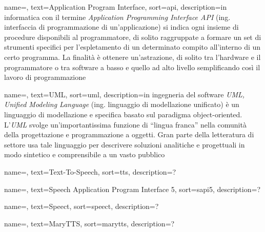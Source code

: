 
\renewcommand{\acronymname}{Acronimi e abbreviazioni}


   
   


{
    name=,
    text=Application Program Interface,
    sort=api,
    description={in informatica con il termine \emph{Application Programming Interface API} (ing. interfaccia di programmazione di un'applicazione) si indica ogni insieme di procedure disponibili al programmatore, di solito raggruppate a formare un set di strumenti specifici per l'espletamento di un determinato compito all'interno di un certo programma. La finalità è ottenere un'astrazione, di solito tra l'hardware e il programmatore o tra software a basso e quello ad alto livello semplificando così il lavoro di programmazione}
}

{
    name=,
    text=UML,
    sort=uml,
    description={in ingegneria del software \emph{UML, Unified Modeling Language} (ing. linguaggio di modellazione unificato) è un linguaggio di modellazione e specifica basato sul paradigma object-oriented. L'\emph{UML} svolge un'importantissima funzione di ``lingua franca'' nella comunità della progettazione e programmazione a oggetti. Gran parte della letteratura di settore usa tale linguaggio per descrivere soluzioni analitiche e progettuali in modo sintetico e comprensibile a un vasto pubblico}
}

{
	name=,
	text=Text-To-Speech,
	sort=tts,
	description={?}
}

{
	name=,
	text=Speech Application Program Interface 5,
	sort=sapi5,
	description={?}
}

{
	name=,
	text=Speect,
	sort=speect,
	description={?}
}

{
	name=,
	text=MaryTTS,
	sort=marytts,
	description={?}
}
